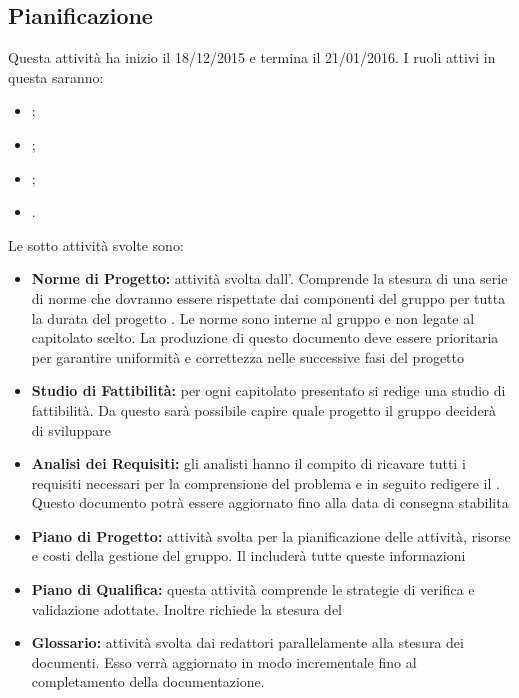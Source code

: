 \documentclass[12pt,a4paper]{article}
\begin{document}
\subsection{Pianificazione} %
Questa attività ha inizio il 18/12/2015 e termina il 21/01/2016. I ruoli attivi in questa  saranno:
\begin{itemize}
	\item \PM;
	\item \AM;
	\item \AN;
	\item \VR.
\end{itemize}
Le sotto attività svolte sono:
\begin{itemize}
	\item \textbf{Norme di Progetto:} attività svolta dall’\AM. Comprende la stesura di una serie di norme che dovranno essere rispettate dai componenti del gruppo per tutta la durata del progetto \prjL. Le norme sono interne al gruppo e non legate al capitolato scelto. La produzione di questo documento deve essere prioritaria per garantire uniformità e correttezza nelle successive fasi del progetto
	\item \textbf{Studio di Fattibilità:} per ogni capitolato presentato si redige una studio di fattibilità. Da questo sarà possibile capire quale progetto il gruppo deciderà di sviluppare
	\item \textbf{Analisi dei Requisiti:} gli analisti hanno il compito di ricavare tutti i requisiti necessari per la comprensione del problema e in seguito redigere il \AdR. Questo documento potrà essere aggiornato fino alla data di consegna stabilita
	\item \textbf{Piano di Progetto:} attività svolta per la pianificazione delle attività, risorse e costi della gestione del gruppo. Il \PdP{} includerà tutte queste informazioni
	\item \textbf{Piano di Qualifica:} questa attività comprende le strategie di verifica e validazione adottate. Inoltre richiede la stesura del \PdQ
	\item \textbf{Glossario:} attività svolta dai redattori parallelamente alla stesura dei documenti. Esso verrà aggiornato in modo incrementale fino al completamento della documentazione.
\end{itemize}
\end{document}
